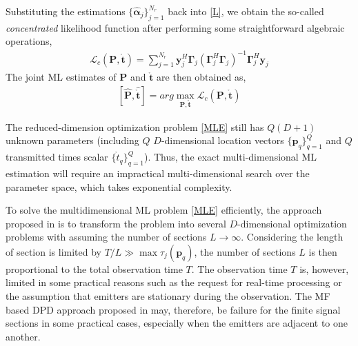 \documentclass[review]{elsarticle}
\begin{document}
Substituting the estimations $\lbrace \hat{\boldsymbol{\alpha}}_j\rbrace _{j=1}^{N_r}$ back into \eqref{L}, we obtain the so-called \emph{concentrated} likelihood function after performing some straightforward algebraic operations,
\begin{align}\label{CLF}
    \mathcal{L}_c(\boldsymbol{P},\mathring{\boldsymbol{t}})=\sum_{j=1}^{N_r}\boldsymbol{y}_j^H\boldsymbol{\Gamma}_{j}(\boldsymbol{\Gamma}_{j}^H\boldsymbol{\Gamma}_{j})^{-1}\boldsymbol{\Gamma}_{j}^H\boldsymbol{y}_j
\end{align}
The joint ML estimates of $\boldsymbol{P}$ and $\mathring{\boldsymbol{t}}$ are then obtained as,
\begin{align}\label{MLE}
    [\hat{\boldsymbol{P}},\hat{\mathring{\boldsymbol{t}}}]=arg \max_{\boldsymbol{P},\mathring{\boldsymbol{t}}} \mathcal{L}_c(\boldsymbol{P},\mathring{\boldsymbol{t}})
\end{align}

The reduced-dimension optimization problem \eqref{MLE} still has $Q(D+1)$ unknown parameters (including $Q$ $D$-dimensional location vectors $\lbrace \boldsymbol{p}_q\rbrace_{q=1}^Q$ and $Q$ transmitted times scalar $\lbrace \mathring{t}_q\rbrace_{q=1}^Q$). Thus, the exact multi-dimensional ML estimation will require an impractical multi-dimensional search over the parameter space, which takes exponential complexity.

To solve the multidimensional ML problem \eqref{MLE} efficiently, the approach proposed in \cite{DPD2005} is to transform the problem into several $D$-dimensional optimization problems with assuming the number of sections $L\to \infty$. Considering the length of section is limited by $T/L\gg \max{\tau_j(\boldsymbol{p}_q)}$, the number of sections $L$ is then proportional to the total observation time $T$. The observation time $T$ is, however, limited in some practical reasons such as the request for real-time processing or the assumption that emitters are stationary during the observation. The MF based DPD approach proposed in \cite{DPD2005} may, therefore, be failure for the finite signal sections in some practical cases, especially when the emitters are adjacent to one another.
\end{document}
